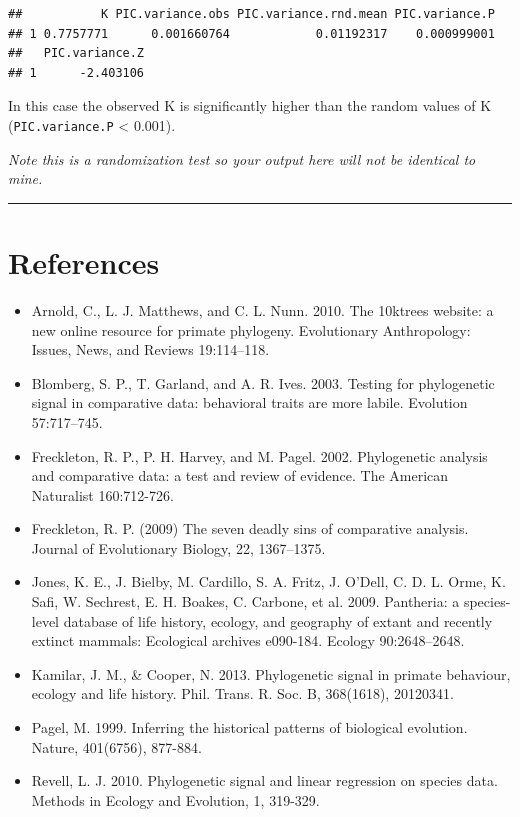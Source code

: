 \documentclass[]{book}
\providecommand{\tightlist}{%
  \setlength{\itemsep}{0pt}\setlength{\parskip}{0pt}}
\begin{document}
\begin{verbatim}
##           K PIC.variance.obs PIC.variance.rnd.mean PIC.variance.P
## 1 0.7757771      0.001660764            0.01192317    0.000999001
##   PIC.variance.Z
## 1      -2.403106
\end{verbatim}

In this case the observed K is significantly higher than the random
values of K (\texttt{PIC.variance.P} \textless{} 0.001).

\emph{Note this is a randomization test so your output here will not be
identical to mine.}

\begin{center}\rule{0.5\linewidth}{\linethickness}\end{center}

\section{References}\label{references-1}

\begin{itemize}
\tightlist
\item
  Arnold, C., L. J. Matthews, and C. L. Nunn. 2010. The 10ktrees
  website: a new online resource for primate phylogeny. Evolutionary
  Anthropology: Issues, News, and Reviews 19:114--118.
\item
  Blomberg, S. P., T. Garland, and A. R. Ives. 2003. Testing for
  phylogenetic signal in comparative data: behavioral traits are more
  labile. Evolution 57:717--745.
\item
  Freckleton, R. P., P. H. Harvey, and M. Pagel. 2002. Phylogenetic
  analysis and comparative data: a test and review of evidence. The
  American Naturalist 160:712-726.
\item
  Freckleton, R. P. (2009) The seven deadly sins of comparative
  analysis. Journal of Evolutionary Biology, 22, 1367--1375.
\item
  Jones, K. E., J. Bielby, M. Cardillo, S. A. Fritz, J. O'Dell, C. D. L.
  Orme, K. Safi, W. Sechrest, E. H. Boakes, C. Carbone, et al. 2009.
  Pantheria: a species-level database of life history, ecology, and
  geography of extant and recently extinct mammals: Ecological archives
  e090-184. Ecology 90:2648--2648.
\item
  Kamilar, J. M., \& Cooper, N. 2013. Phylogenetic signal in primate
  behaviour, ecology and life history. Phil. Trans. R. Soc. B,
  368(1618), 20120341.
\item
  Pagel, M. 1999. Inferring the historical patterns of biological
  evolution. Nature, 401(6756), 877-884.
\item
  Revell, L. J. 2010. Phylogenetic signal and linear regression on
  species data. Methods in Ecology and Evolution, 1, 319-329.
\end{itemize}
\end{document}
